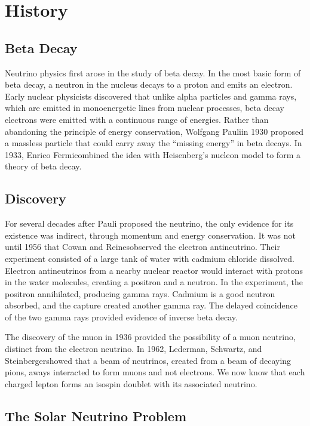 \documentclass[herrin-thesis.tex]{subfiles}
\begin{document}
\section{History}
\subsection{Beta Decay}
Neutrino physics first arose in the study of beta decay. In the most basic form of beta decay, a neutron in the nucleus decays to a proton and emits an electron. Early nuclear physicists discovered that unlike alpha particles and gamma rays, which are emitted in monoenergetic lines from nuclear processes, beta decay electrons were emitted with a continuous range of energies. Rather than abandoning the principle of energy conservation, Wolfgang Pauli\addref in 1930 proposed a massless particle that could carry away the ``missing energy'' in beta decays. In 1933, Enrico Fermi\addref combined the idea with Heisenberg's nucleon model to form a theory of beta decay.

\subsection{Discovery}
For several decades after Pauli proposed the neutrino, the only evidence for its existence was indirect, through momentum and energy conservation. It was not until 1956 that Cowan and Reines\addref observed the electron antineutrino. Their experiment consisted of a large tank of water with cadmium chloride dissolved. Electron antineutrinos from a nearby nuclear reactor would interact with protons in the water molecules, creating a positron and a neutron. In the experiment, the positron annihilated, producing gamma rays. Cadmium is a good neutron absorbed, and the capture created another gamma ray. The delayed coincidence of the two gamma rays provided evidence of inverse beta decay.

The discovery of the muon in 1936 provided the possibility of a muon neutrino, distinct from the electron neutrino. In 1962, Lederman, Schwartz, and Steinberger\addref showed that a beam of neutrinos, created from a beam of decaying pions, aways interacted to form muons and not electrons. We now know that each charged lepton forms an isospin doublet with its associated neutrino.

\subsection{The Solar Neutrino Problem}
\end{document}
